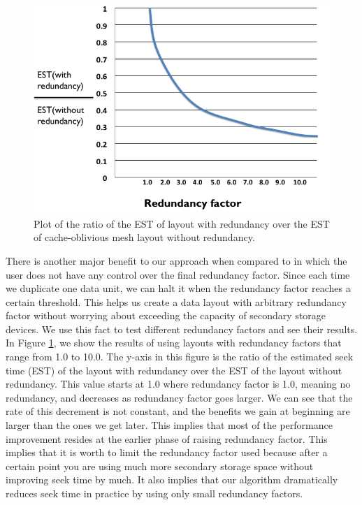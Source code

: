\begin{figure}[ht]
\centering
\includegraphics[width=\columnwidth]{statistic.png}
  \caption{Plot of the ratio of the EST of layout with redundancy over the EST of cache-oblivious mesh layout without redundancy. }
  \label{fig:statistic}
\end{figure} 

There is another major benefit to our approach when compared to \cite{optimizingredundancy} in which the user does not have any control over the final redundancy factor. Since each time we duplicate one data unit, we can halt it when the redundancy factor reaches a certain threshold. This helps us create a data layout with arbitrary redundancy factor without worrying about exceeding the capacity of secondary storage devices. We use this fact to test different redundancy factors and see their results. In Figure \ref{fig:statistic}, we show the results of using layouts with redundancy factors that range from 1.0 to 10.0. The y-axis in this figure is the ratio of the estimated seek time (EST) of the layout with redundancy over the EST of the layout without redundancy. This value starts at 1.0 where redundancy factor is 1.0, meaning no redundancy, and decreases as redundancy factor goes larger. We can see that the rate of this decrement is not constant, and the benefits we gain at beginning are larger than the ones we get later. This implies that most of the performance improvement resides at the earlier phase of raising redundancy factor. This implies that it is worth to limit the redundancy factor used because after a certain point you are using much more secondary storage space without improving seek time by much. It also implies that our algorithm dramatically reduces seek time in practice by using only small redundancy factors. 

